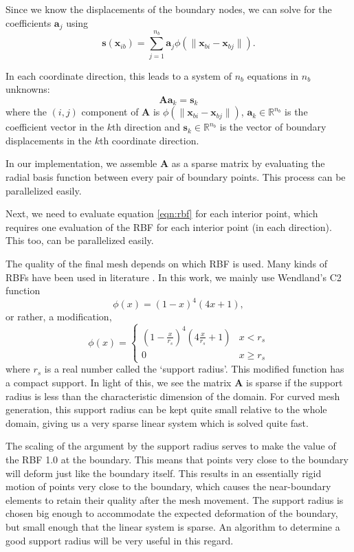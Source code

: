 \documentclass[11pt, ms, onehalfspacing]{ncsuthesis}
\let\bld\boldsymbol
\begin{document}
Since we know the displacements of the boundary nodes, we can solve for the coefficients $\mathbf{a}_j$ using
\begin{equation}
\mathbf{s}(\mathbf{x}_{ib}) = \sum_{j=1}^{n_b} \mathbf{a}_j \phi(\lVert\mathbf{x}_{bi} - \mathbf{x}_{bj}\rVert).
\end{equation}

In each coordinate direction, this leads to a system of $n_b$ equations in $n_b$ unknowns:
\begin{equation}
\mathbf{A}\mathbf{a}_k = \mathbf{s}_k
\end{equation}
where the $(i,j)$ component of $\mathbf{A}$ is $\phi(\lVert\mathbf{x}_{bi} - \mathbf{x}_{bj} \rVert)$, $\bld{a}_k \in \mathbb{R}^{n_b}$ is the coefficient vector in the $k$th direction and $\bld{s}_k \in \mathbb{R}^{n_b}$ is the vector of boundary displacements in the $k$th coordinate direction.

In our implementation, we assemble $\mathbf{A}$ as a sparse matrix by evaluating the radial basis function between every pair of boundary points. This process can be parallelized easily.

Next, we need to evaluate equation \eqref{eqn:rbf} for each interior point, which requires one evaluation of the RBF for each interior point (in each direction). This too, can be parallelized easily.

The quality of the final mesh depends on which RBF is used. Many kinds of RBFs have been used in literature \cite{mm:rbf, mm:rbf2}. In this work, we mainly use Wendland's C2 function
\begin{equation}
\phi(x) = (1-x)^4(4x + 1),
\end{equation}
or rather, a modification,
\begin{equation}
\phi(x) = 
\begin{cases}
\left(1-\frac{x}{r_s}\right)^4\left(4\frac{x}{r_s} + 1\right) & x < r_s \\
0 & x \geq r_s
\end{cases}
\end{equation}
where $r_s$ is a real number called the `support radius'. This modified function has a compact support. In light of this, we see the matrix $\mathbf{A}$ is sparse if the support radius is less than the characteristic dimension of the domain. For curved mesh generation, this support radius can be kept quite small relative to the whole domain, giving us a very sparse linear system which is solved quite fast.

The scaling of the argument by the support radius serves to make the value of the RBF 1.0 at the boundary. This means that points very close to the boundary will deform just like the boundary itself. This results in an essentially rigid motion of points very close to the boundary, which causes the near-boundary elements to retain their quality after the mesh movement. The support radius is chosen big enough to accommodate the expected deformation of the boundary, but small enough that the linear system is sparse. An algorithm to determine a good support radius will be very useful in this regard.
\end{document}
